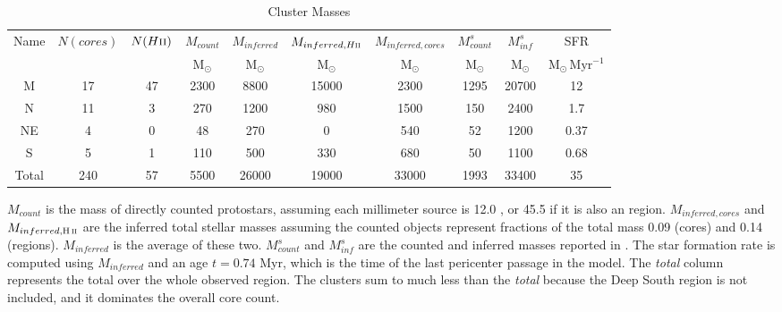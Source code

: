 \begin{table*}[htp]
\centering
\caption{Cluster Masses}
\begin{tabular}{cccccccccc}
\label{tab:clustermassestimates}
Name & $N(cores)$ & $N(H\textsc{ii})$ & $M_{count}$ & $M_{inferred}$ & $M_{inferred, H\textsc{ii}}$ & $M_{inferred, cores}$ & $M_{count}^s$ & $M_{inf}^s$ & SFR \\
 &  &  & $\mathrm{M_{\odot}}$ & $\mathrm{M_{\odot}}$ & $\mathrm{M_{\odot}}$ & $\mathrm{M_{\odot}}$ & $\mathrm{M_{\odot}}$ & $\mathrm{M_{\odot}}$ & $\mathrm{M_{\odot}\,Myr^{-1}}$ \\
\hline
M & 17 & 47 & 2300 & 8800 & 15000 & 2300 & 1295 & 20700 & 12 \\
N & 11 & 3 & 270 & 1200 & 980 & 1500 & 150 & 2400 & 1.7 \\
NE & 4 & 0 & 48 & 270 & 0 & 540 & 52 & 1200 & 0.37 \\
S & 5 & 1 & 110 & 500 & 330 & 680 & 50 & 1100 & 0.68 \\
Total & 240 & 57 & 5500 & 26000 & 19000 & 33000 & 1993 & 33400 & 35 \\
\hline
\end{tabular}
\par
$M_{count}$ is the mass of directly counted protostars, assuming each millimeter source is 12.0 \msun, or 45.5 \msun if it is also an \hii region.  $M_{inferred,cores}$ and $M_{inferred,\hii}$ are the inferred total stellar masses assuming the counted objects represent fractions of the total mass 0.09 (cores) and 0.14 (\hii regions).  $M_{inferred}$ is the average of these two.  $M_{count}^s$ and $M_{inf}^s$ are the counted and inferred masses reported in \citet{Schmiedeke2016a}.  The star formation rate is computed using $M_{inferred}$ and an age $t=0.74$ Myr, which is the time of the last pericenter passage in the \citet{Kruijssen2015a} model.  The \emph{total} column represents the total over the whole observed region.    The clusters sum to much less than the \emph{total} because the Deep South region is not included, and it dominates the overall core count.
\end{table*}
